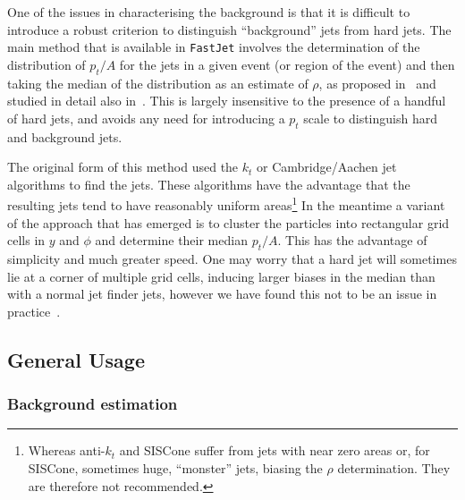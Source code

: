 \documentclass[12pt,a4]{article}
\newcommand{\fastjet}{\texttt{FastJet}\xspace}
\begin{document}
One of the issues in characterising the background is that it is
difficult to introduce a robust criterion to distinguish
``background'' jets from hard jets.
%
The main method that is available in \fastjet involves the
determination of the distribution of $p_t/A$ for the jets in a given
event (or region of the event) and then taking the median of the
distribution as an estimate of $\rho$, as proposed in~\cite{cs} and
studied in detail also in~\cite{Cacciari:2009dp,GridMedianLH}.
%
This is largely insensitive to the presence of a handful of hard jets, and
avoids any need for introducing a $p_t$ scale to distinguish hard and
background jets.


The original form of this method used the $k_t$ or Cambridge/Aachen
jet algorithms to find the jets.
%
These algorithms have the advantage that the resulting jets tend to
have reasonably uniform areas\footnote{Whereas anti-$k_t$ and SISCone
  suffer from jets with near zero areas or, for SISCone, sometimes
  huge, ``monster'' jets, biasing the $\rho$ determination. They are
  therefore not recommended.}
%
In the meantime a variant of the approach that has emerged is to
cluster the particles into rectangular grid cells in $y$ and $\phi$
and determine their median $p_t/A$.
%
This has the advantage of simplicity and much greater speed. 
%
One may worry that a hard jet will sometimes lie at a corner of
multiple grid cells, inducing larger biases in the median than with a
normal jet finder jets, however we have found this not
to be an issue in practice~\cite{GridMedianLH}.

\subsection{General Usage}\label{sec:bkg_general_usage}

\subsubsection{Background estimation}\label{sec:bkg_estim_usage}
\end{document}

